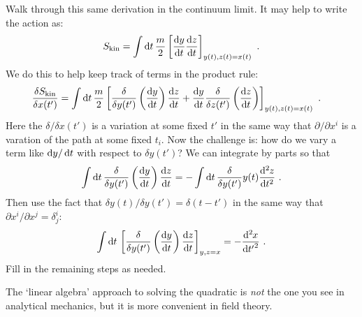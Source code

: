 \begin{exercise}
Walk through this same derivation in the continuum limit. It may help to write the action as:
\begin{align}
    S_\text{kin} = 
    \int \D{t}\,
    \frac{ m }{ 2 }
    \left[ 
        \frac{ \D{y} }{ \D{t} }
        \frac{ \D{z} }{ \D{t} }
    \right]_{y(t), z(t) =x(t)} \ .
\end{align}
We do this to help keep track of terms in the product rule:
\begin{align}
    \frac{ \delta S_\text{kin} }{ \delta x(t') }
    &=
    \int \D{t}\,
    \frac{ m }{ 2 }
    \left[ 
        \frac{\delta}{\delta y(t')}
        \left(\frac{ \D{y} }{ \D{t} }\right)
        \frac{ \D{z} }{ \D{t} }
        +
        \frac{ \D{y} }{ \D{t} }
        \frac{\delta}{\delta z(t')}
        \left(\frac{ \D{z} }{ \D{t} }\right)
    \right]_{y(t), z(t) =x(t)} \ .
\end{align}
Here the $\delta/\delta x(t')$ is a variation at some fixed $t'$ in the same way that $\partial/\partial x^i$ is a varation of the path at some fixed $t_i$. Now the challenge is: how do we vary a term like $\D{y}/\D{t}$ with respect to $\delta y(t')$? We can integrate by parts so that
\begin{align}
    \int \D{t}\,
    \frac{\delta}{\delta y(t')}
        \left(\frac{ \D{y} }{ \D{t} }\right)
        \frac{ \D{z} }{ \D{t} }
    =
    -
    \int \D{t}\,
    \frac{\delta}{\delta y(t')}
        y(t)
        \frac{ \D[2]{z} }{ \D{t}^2 } 
        \ .
\end{align}
Then use the fact that $\delta y(t)/\delta y(t') = \delta(t-t')$ in the same way that $\partial x^i/\partial x^j = \delta^i_j$:
\begin{align}
    \int \D{t}\,
    \left[\frac{\delta}{\delta y(t')}
                \left(\frac{ \D{y} }{ \D{t} }\right)
                \frac{ \D{z} }{ \D{t} }\right]_{y,z = x}
    =
    - \frac{ \D[2]{x} }{ \D{t'}^2 } \ .
\end{align}
Fill in the remaining steps as needed.
\end{exercise}
The `linear algebra' approach to solving the quadratic is \emph{not} the one you see in analytical mechanics, but it is more convenient in field theory.





